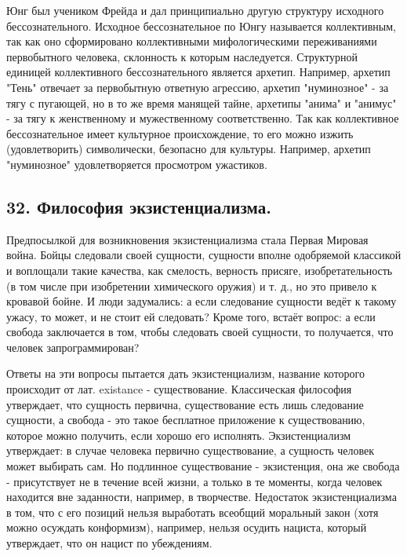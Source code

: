 \documentclass[a4paper, 12pt]{article}
\begin{document}
Юнг был учеником Фрейда и дал принципиально другую структуру исходного бессознательного.
Исходное бессознательное по Юнгу называется коллективным, так как оно сформировано коллективными мифологическими переживаниями первобытного человека, склонность к которым наследуется.
Структурной единицей коллективного бессознательного является архетип.
Например, архетип "Тень" отвечает за первобытную ответную агрессию, архетип "нуминозное" - за тягу с пугающей, но в то же время манящей тайне, архетипы "анима" и "анимус" - за тягу к женственному и мужественному соответственно.
Так как коллективное бессознательное имеет культурное происхождение, то его можно изжить (удовлетворить) символически, безопасно для культуры.
Например, архетип "нуминозное" удовлетворяется просмотром ужастиков.

\subsection*{\textbf{32. Философия экзистенциализма.}}

Предпосылкой для возникновения экзистенциализма стала Первая Мировая война.
Бойцы следовали своей сущности, сущности вполне одобряемой классикой и воплощали такие качества, как смелость, верность присяге, изобретательность (в том числе при изобретении химического оружия) и т. д., но это привело к кровавой бойне.
И люди задумались: а если следование сущности ведёт к такому ужасу, то может, и не стоит ей следовать?
Кроме того, встаёт вопрос: а если свобода заключается в том, чтобы следовать своей сущности, то получается, что человек запрограммирован?

Ответы на эти вопросы пытается дать экзистенциализм, название которого происходит от лат. existance - существование.
Классическая философия утверждает, что сущность первична, существование есть лишь следование сущности, а свобода - это такое бесплатное приложение к существованию, которое можно получить, если хорошо его исполнять.
Экзистенциализм утверждает: в случае человека первично существование, а сущность человек может выбирать сам.
Но подлинное существование - экзистенция, она же свобода - присутствует не в течение всей жизни, а только в те моменты, когда человек находится вне заданности, например, в творчестве.
Недостаток экзистенциализма в том, что с его позиций нельзя выработать всеобщий моральный закон (хотя можно осуждать конформизм), например, нельзя осудить нациста, который утверждает, что он нацист по убеждениям.
\end{document}
